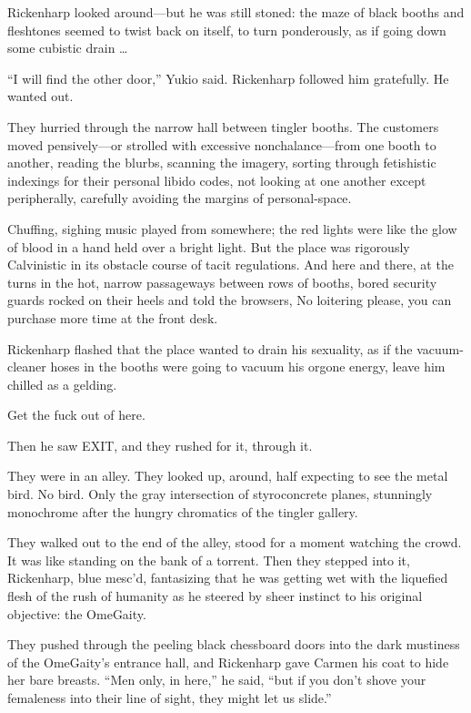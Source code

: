Rickenharp looked around—but he was still stoned: the maze of black booths and fleshtones seemed to twist back on itself, to turn ponderously, as if going down some cubistic drain …

“I will find the other door,” Yukio said. Rickenharp followed him gratefully. He wanted out.

They hurried through the narrow hall between tingler booths. The customers moved pensively—or strolled with excessive nonchalance—from one booth to another, reading the blurbs, scanning the imagery, sorting through fetishistic indexings for their personal libido codes, not looking at one another except peripherally, carefully avoiding the margins of personal-space.

Chuffing, sighing music played from somewhere; the red lights were like the glow of blood in a hand held over a bright light. But the place was rigorously Calvinistic in its obstacle course of tacit regulations. And here and there, at the turns in the hot, narrow passageways between rows of booths, bored security guards rocked on their heels and told the browsers, No loitering please, you can purchase more time at the front desk.

Rickenharp flashed that the place wanted to drain his sexuality, as if the vacuum-cleaner hoses in the booths were going to vacuum his orgone energy, leave him chilled as a gelding.

Get the fuck out of here.

Then he saw EXIT, and they rushed for it, through it.

They were in an alley. They looked up, around, half expecting to see the metal bird. No bird. Only the gray intersection of styroconcrete planes, stunningly monochrome after the hungry chromatics of the tingler gallery.

They walked out to the end of the alley, stood for a moment watching the crowd. It was like standing on the bank of a torrent. Then they stepped into it, Rickenharp, blue mesc’d, fantasizing that he was getting wet with the liquefied flesh of the rush of humanity as he steered by sheer instinct to his original objective: the OmeGaity.

They pushed through the peeling black chessboard doors into the dark mustiness of the OmeGaity’s entrance hall, and Rickenharp gave Carmen his coat to hide her bare breasts. “Men only, in here,” he said, “but if you don’t shove your femaleness into their line of sight, they might let us slide.”

